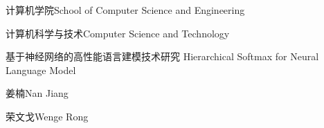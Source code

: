 
\school
{计算机学院}{School of Computer Science and Engineering}

\major
{计算机科学与技术}{Computer Science and Technology}

\thesistitle
{基于神经网络的高性能语言建模技术研究}
{}
{Hierarchical Softmax for Neural Language Model}
{}

\thesisauthor
{姜楠}{Nan Jiang}

\teacher
{荣文戈}{Wenge Rong}






